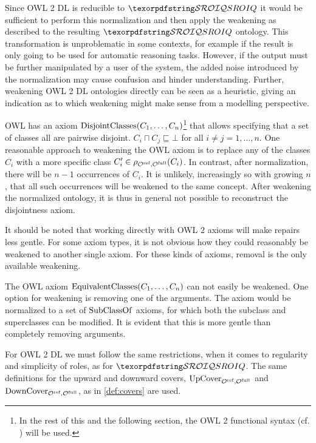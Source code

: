 Since OWL 2 DL is reducible to $\SROIQ$ it would be sufficient to perform this normalization and then apply the weakening as described to the resulting $\SROIQ$ ontology. This transformation is unproblematic in some contexts, for example if the result is only going to be used for automatic reasoning tasks. However, if the output must be further manipulated by a user of the system, the added noise introduced by the normalization may cause confusion and hinder understanding. Further, weakening OWL 2 DL ontologies directly can be seen as a heuristic, giving an indication as to which weakening might make sense from a modelling perspective.

\begin{example}
  OWL has an axiom $\operatorname{DisjointClasses}(C_1, \dots, C_n)$\footnote{In the rest of this and the following section, the OWL 2 functional syntax (cf. \cite{motik2012ontology}) will be used.} that allows specifying that a set of classes all are pairwise disjoint. $C_i \sqcap C_j \sqsubseteq \bot$ for all $i \not= j = 1, \dots, n$. One reasonable approach to weakening the OWL axiom is to replace any of the classes $C_i$ with a more specific class $C_i' \in \rho_{{\mathcal{O}^\textnormal{ref}},{\mathcal{O}^\textnormal{full}}}(C_i)$. In contrast, after normalization, there will be $n - 1$ occurrences of $C_i$. It is unlikely, increasingly so with growing $n$, that all such occurrences will be weakened to the same concept. After weakening the normalized ontology, it is thus in general not possible to reconstruct the disjointness axiom.
\end{example}

It should be noted that working directly with OWL 2 axioms will make repairs less gentle. For some axiom types, it is not obvious how they could reasonably be weakened to another single axiom. For these kinds of axioms, removal is the only available weakening.

\begin{example}
  The OWL axiom $\operatorname{EquivalentClasses}(C_1, \dots, C_n)$ can not easily be weakened. One option for weakening is removing one of the arguments. The axiom would be normalized to a set of $\operatorname{SubClassOf}$ axioms, for which both the subclass and superclasses can be modified. It is evident that this is more gentle than completely removing arguments.
\end{example}

For OWL 2 DL we must follow the same restrictions, when it comes to regularity and simplicity of roles, as for $\SROIQ$. The same definitions for the upward and downward covers, ${\operatorname{UpCover}}_{{\mathcal{O}^\textnormal{ref}},{\mathcal{O}^\textnormal{full}}}$ and ${\operatorname{DownCover}}_{{\mathcal{O}^\textnormal{ref}},{\mathcal{O}^\textnormal{full}}}$, as in \cref{def:covers} are used.

